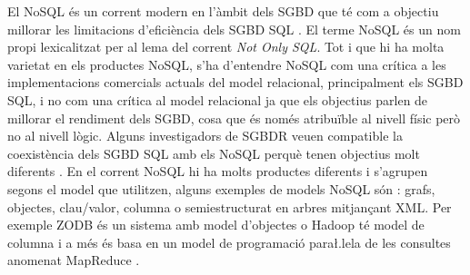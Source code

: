 El NoSQL és un corrent modern en l'àmbit dels \gls{SGBD} que té com a
objectiu millorar les limitacions d'eficiència dels \gls{SGBD}
\gls{SQL} \parencite{edlich:nosql,stonebraker10}. El terme NoSQL és un nom
propi lexicalitzat per al lema del corrent \emph{Not Only SQL}.  Tot i
que hi ha molta varietat en els productes NoSQL, s'ha d'entendre NoSQL
com una crítica a les implementacions comercials actuals del model
relacional, principalment els \gls{SGBD} \gls{SQL}, i no com una crítica al model
relacional ja que els objectius parlen de millorar el rendiment dels
\gls{SGBD}, cosa que és només atribuïble al nivell físic però no al nivell
lògic.  Alguns investigadors de \gls{SGBDR} veuen compatible la coexistència
dels \gls{SGBD} \gls{SQL} amb els NoSQL perquè tenen objectius molt diferents
\parencite{atzeni13:relational_model_dead}.  En el corrent NoSQL hi ha
molts productes diferents i s'agrupen segons el model que utilitzen,
alguns exemples de models NoSQL són \parencite{edlich:nosql}: grafs, 
objectes, clau/valor, columna o semiestructurat en arbres mitjançant \gls{XML}.
Per exemple ZODB \parencite{zodb} és un sistema amb model d'objectes o
Hadoop \parencite{hadoop} té model de columna i a més és basa en un
model de programació para\l.lela de les consultes anomenat
MapReduce \parencite{deanghemawat04:mapreduce}. %


